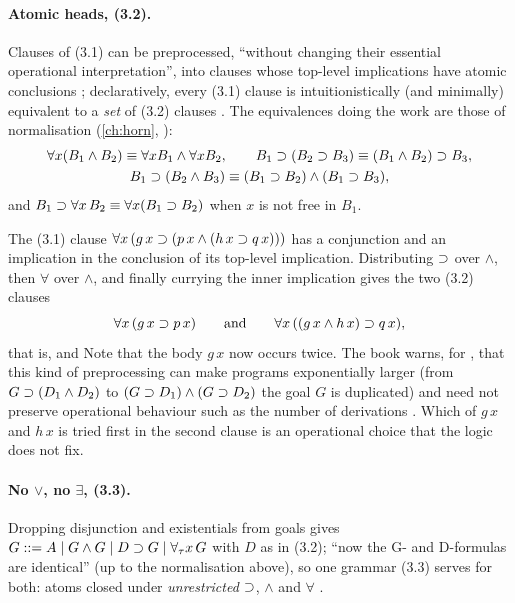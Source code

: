 {{\paragraph{Atomic heads, (3.2).} Clauses of (3.1) can be preprocessed, ``without changing their essential
operational interpretation'', into clauses whose top-level implications have atomic conclusions
; declaratively, every (3.1) clause is intuitionistically (and minimally) equivalent to a
\emph{set} of (3.2) clauses . The equivalences doing the work are those of \fohc{} normalisation
(\cref{ch:horn}, ):
\begin{gather*}
\forall x(B_1\wedge B_2)\equiv\forall x B_1\wedge\forall x B_2,\qquad
B_1\supset(B_2\supset B_3)\equiv(B_1\wedge B_2)\supset B_3,\\
B_1\supset(B_2\wedge B_3)\equiv(B_1\supset B_2)\wedge(B_1\supset B_3),
\end{gather*}
and $B_1\supset\forall x\,B_2\equiv\forall x(B_1\supset B_2)$ when $x$ is not free in $B_1$.

\begin{example}
The (3.1) clause $\forall x\,(g\,x\supset(p\,x\wedge(h\,x\supset q\,x)))$ has a conjunction and an implication
in the conclusion of its top-level implication. Distributing $\supset$ over $\wedge$, then $\forall$ over
$\wedge$, and finally currying the inner implication gives the two (3.2) clauses
\[
\forall x\,(g\,x\supset p\,x)\qquad\text{and}\qquad\forall x\,((g\,x\wedge h\,x)\supset q\,x),
\]
that is,  and  Note that the body $g\,x$ now occurs twice. The book
warns, for \fohc, that this kind of preprocessing can make programs exponentially larger (from
$G\supset(D_1\wedge D_2)$ to $(G\supset D_1)\wedge(G\supset D_2)$ the goal $G$ is duplicated) and need not preserve
operational behaviour such as the number of derivations . Which of $g\,x$ and $h\,x$ is
tried first in the second clause is an operational choice that the logic does not fix.
\end{example}

\paragraph{No $\vee$, no $\exists$, (3.3).} Dropping disjunction and existentials from goals gives
$G::=A\mid G\wedge G\mid D\supset G\mid\forall_\tau x\,G$ with $D$ as in (3.2); ``now the G- and D-formulas are
identical'' (up to the normalisation above), so one grammar (3.3) serves for both: atoms closed under
\emph{unrestricted} $\supset$, $\wedge$ and $\forall$ .

}}
